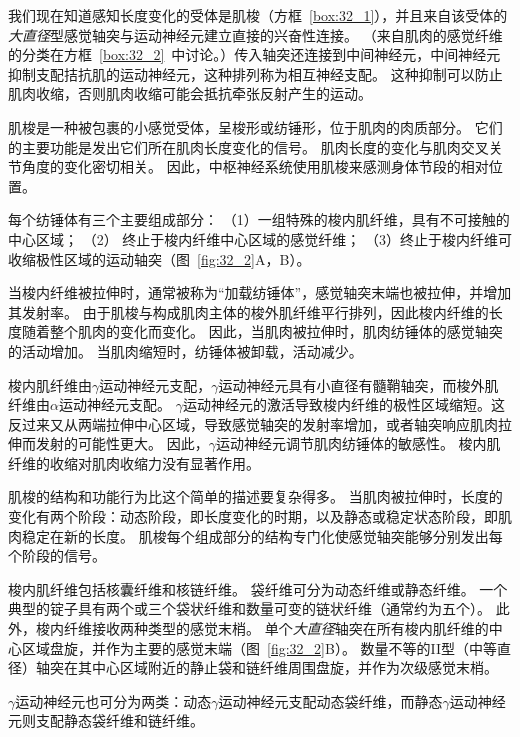 我们现在知道感知长度变化的受体是肌梭（方框~\ref{box:32_1}），并且来自该受体的\textit{大直径}型感觉轴突与运动神经元建立直接的兴奋性连接。
（来自肌肉的感觉纤维的分类在方框~\ref{box:32_2}~中讨论。）传入轴突还连接到中间神经元，中间神经元抑制支配拮抗肌的运动神经元，这种排列称为相互神经支配。
这种抑制可以防止肌肉收缩，否则肌肉收缩可能会抵抗牵张反射产生的运动。


\begin{proposition}[肌梭] \label{box:32_1}
	
	\quad \quad 肌梭是一种被包裹的小感觉受体，呈梭形或纺锤形，位于肌肉的肉质部分。
	它们的主要功能是发出它们所在肌肉长度变化的信号。
	肌肉长度的变化与肌肉交叉关节角度的变化密切相关。
	因此，中枢神经系统使用肌梭来感测身体节段的相对位置。
	
	\quad \quad 每个纺锤体有三个主要组成部分：
	（1）一组特殊的梭内肌纤维，具有不可接触的中心区域；
	（2） 终止于梭内纤维中心区域的感觉纤维；
	（3）终止于梭内纤维可收缩极性区域的运动轴突（图~\ref{fig:32_2}A，B）。
	
	\quad \quad 当梭内纤维被拉伸时，通常被称为“加载纺锤体”，感觉轴突末端也被拉伸，并增加其发射率。
	由于肌梭与构成肌肉主体的梭外肌纤维平行排列，因此梭内纤维的长度随着整个肌肉的变化而变化。
	因此，当肌肉被拉伸时，肌肉纺锤体的感觉轴突的活动增加。
	当肌肉缩短时，纺锤体被卸载，活动减少。
	
	\quad \quad 梭内肌纤维由$ \gamma $运动神经元支配，$ \gamma $运动神经元具有小直径有髓鞘轴突，而梭外肌纤维由$ \alpha $运动神经元支配。
	$ \gamma $运动神经元的激活导致梭内纤维的极性区域缩短。这反过来又从两端拉伸中心区域，导致感觉轴突的发射率增加，或者轴突响应肌肉拉伸而发射的可能性更大。
	因此，$ \gamma $运动神经元调节肌肉纺锤体的敏感性。
	梭内肌纤维的收缩对肌肉收缩力没有显著作用。
	
	\quad \quad 肌梭的结构和功能行为比这个简单的描述要复杂得多。
	当肌肉被拉伸时，长度的变化有两个阶段：动态阶段，即长度变化的时期，以及静态或稳定状态阶段，即肌肉稳定在新的长度。
	肌梭每个组成部分的结构专门化使感觉轴突能够分别发出每个阶段的信号。
	
	
	\quad \quad 梭内肌纤维包括核囊纤维和核链纤维。
	袋纤维可分为动态纤维或静态纤维。
	一个典型的锭子具有两个或三个袋状纤维和数量可变的链状纤维（通常约为五个）。
	此外，梭内纤维接收两种类型的感觉末梢。
	单个\textit{大直径}轴突在所有梭内肌纤维的中心区域盘旋，并作为主要的感觉末端（图~\ref{fig:32_2}B）。
	数量不等的II型（中等直径）轴突在其中心区域附近的静止袋和链纤维周围盘旋，并作为次级感觉末梢。
	
	
	\quad \quad $ \gamma $运动神经元也可分为两类：动态$ \gamma $运动神经元支配动态袋纤维，而静态$ \gamma $运动神经元则支配静态袋纤维和链纤维。
	

\end{proposition}
